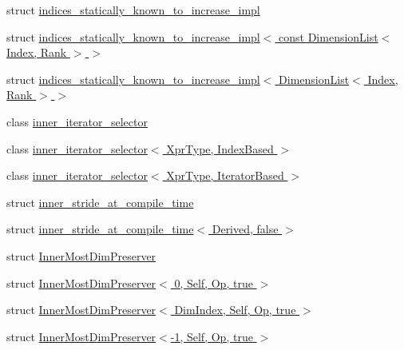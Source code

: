\begin{DoxyCompactItemize}
struct \hyperlink{struct_eigen_1_1internal_1_1indices__statically__known__to__increase__impl}{indices\+\_\+statically\+\_\+known\+\_\+to\+\_\+increase\+\_\+impl}
\item 
struct \hyperlink{struct_eigen_1_1internal_1_1indices__statically__known__to__increase__impl_3_01const_01_dimensio6db8c53663683fc03a6211a2a9a1ff02}{indices\+\_\+statically\+\_\+known\+\_\+to\+\_\+increase\+\_\+impl$<$ const Dimension\+List$<$ Index, Rank $>$ $>$}
\item 
struct \hyperlink{struct_eigen_1_1internal_1_1indices__statically__known__to__increase__impl_3_01_dimension_list_3_01_index_00_01_rank_01_4_01_4}{indices\+\_\+statically\+\_\+known\+\_\+to\+\_\+increase\+\_\+impl$<$ Dimension\+List$<$ Index, Rank $>$ $>$}
\item 
class \hyperlink{class_eigen_1_1internal_1_1inner__iterator__selector}{inner\+\_\+iterator\+\_\+selector}
\item 
class \hyperlink{class_eigen_1_1internal_1_1inner__iterator__selector_3_01_xpr_type_00_01_index_based_01_4}{inner\+\_\+iterator\+\_\+selector$<$ Xpr\+Type, Index\+Based $>$}
\item 
class \hyperlink{class_eigen_1_1internal_1_1inner__iterator__selector_3_01_xpr_type_00_01_iterator_based_01_4}{inner\+\_\+iterator\+\_\+selector$<$ Xpr\+Type, Iterator\+Based $>$}
\item 
struct \hyperlink{struct_eigen_1_1internal_1_1inner__stride__at__compile__time}{inner\+\_\+stride\+\_\+at\+\_\+compile\+\_\+time}
\item 
struct \hyperlink{struct_eigen_1_1internal_1_1inner__stride__at__compile__time_3_01_derived_00_01false_01_4}{inner\+\_\+stride\+\_\+at\+\_\+compile\+\_\+time$<$ Derived, false $>$}
\item 
struct \hyperlink{struct_eigen_1_1internal_1_1_inner_most_dim_preserver}{Inner\+Most\+Dim\+Preserver}
\item 
struct \hyperlink{struct_eigen_1_1internal_1_1_inner_most_dim_preserver_3_010_00_01_self_00_01_op_00_01true_01_4}{Inner\+Most\+Dim\+Preserver$<$ 0, Self, Op, true $>$}
\item 
struct \hyperlink{struct_eigen_1_1internal_1_1_inner_most_dim_preserver_3_01_dim_index_00_01_self_00_01_op_00_01true_01_4}{Inner\+Most\+Dim\+Preserver$<$ Dim\+Index, Self, Op, true $>$}
\item 
struct \hyperlink{struct_eigen_1_1internal_1_1_inner_most_dim_preserver_3-1_00_01_self_00_01_op_00_01true_01_4}{Inner\+Most\+Dim\+Preserver$<$-\/1, Self, Op, true $>$}
\item 

\end{DoxyCompactItemize}
